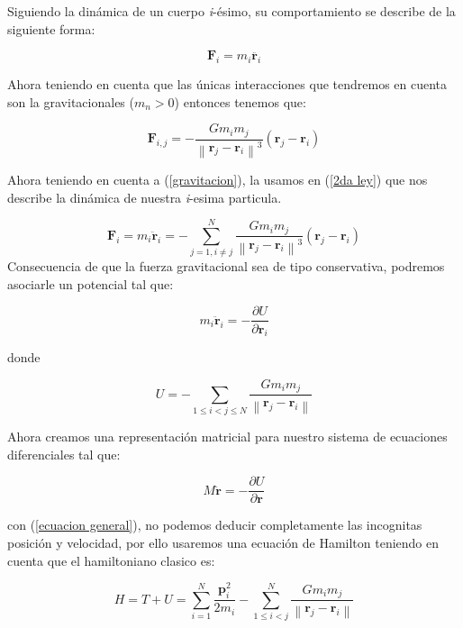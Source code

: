 Siguiendo la dinámica de un cuerpo \textit{i}-ésimo, su comportamiento se describe de la siguiente forma:


\begin{equation}\label{2da ley}
    \mathbf{F}_i=m_i\ddot{\mathbf{r}_i}
\end{equation}

Ahora teniendo en cuenta que las únicas interacciones que tendremos en cuenta son la gravitacionales ($m_n>0$) entonces tenemos que:

\begin{equation}\label{gravitacion}
    \mathbf{F}_{i,j}=-\frac{Gm_im_j}{\left\|\mathbf{r}_j -\mathbf{r}_i\right \|^3}(\mathbf{r}_j -\mathbf{r}_i)
\end{equation}

Ahora teniendo en cuenta a (\ref{gravitacion}), la usamos en (\ref{2da ley}) que nos describe la dinámica de nuestra \textit{i}-esima particula.

\begin{equation*}
    \mathbf{F}_i=m_i\ddot{\mathbf{r}}_i=-\sum_{j=1, i\neq j}^N\frac{Gm_im_j}{\left\|\mathbf{r}_j -\mathbf{r}_i\right \|^3}(\mathbf{r}_j -\mathbf{r}_i)
\end{equation*}
Consecuencia de que la fuerza gravitacional sea de tipo conservativa, podremos asociarle un potencial tal que:

\begin{equation*}
    m_i\ddot{\mathbf{r}}_i=-\frac{\partial U}{\partial \mathbf{r}_i}
\end{equation*}

donde

\begin{equation}
    U=-\sum_{1\leq i<j\leq N} \frac{Gm_im_j}{\left\|\mathbf{r}_j -\mathbf{r}_i\right \|}
\end{equation}

Ahora creamos una representación matricial para nuestro sistema de ecuaciones diferenciales tal que:

\begin{equation}\label{ecuacion general}
    M\ddot{\mathbf{r}}=-\frac{\partial U}{\partial \mathbf{r}}
\end{equation}

con (\ref{ecuacion general}), no podemos deducir completamente las incognitas posición y velocidad, por ello usaremos una ecuación de Hamilton teniendo en cuenta que el hamiltoniano clasico es:

\begin{equation*}
    H=T+U=\sum^N_{i=1}\frac{\mathbf{p}_i^2}{2m_i}-\sum_{1\leq i<j}^N \frac{Gm_im_j}{\left\|\mathbf{r}_j -\mathbf{r}_i\right \|}
\end{equation*}

